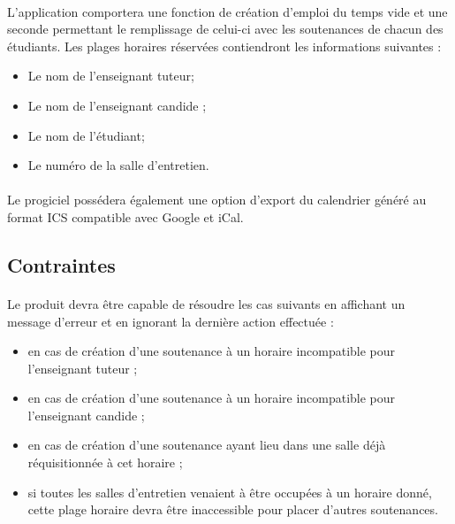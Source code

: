 \documentclass[a4paper,10pt]{report}
\begin{document}
	\paragraph{}
	L’application comportera une fonction de création d’emploi du temps vide et une seconde permettant le remplissage de celui-ci avec les soutenances de chacun des étudiants.
	\newline
	\newline
	Les plages horaires réservées contiendront les informations suivantes :
	\newline
	\renewcommand\labelitemi{\textbullet}
	\begin{itemize}
	  \item Le nom de l’enseignant tuteur;
	  \item Le nom de l’enseignant candide ;
	  \item Le nom de l’étudiant;
	  \item Le numéro de la salle d’entretien.
	\end{itemize}
	
	\paragraph{}
	Le progiciel possédera également une option d’export du calendrier généré au format ICS compatible avec Google et iCal.
	
      \subsection{Contraintes}
	\paragraph{}

	Le produit devra être capable de résoudre les cas suivants en affichant un message d’erreur et en ignorant la dernière action effectuée :
	\newline
	\renewcommand\labelitemi{\textbullet}
	\begin{itemize}
	  \item en cas de création d'une soutenance à un horaire incompatible pour l'enseignant tuteur ;
	  \item en cas de création d'une soutenance à un horaire incompatible pour l'enseignant candide ;
	  \item en cas de création d'une soutenance ayant lieu dans une salle déjà réquisitionnée à cet horaire ;
	  \item si toutes les salles d’entretien venaient à être occupées à un horaire donné, cette plage horaire devra être inaccessible pour placer d’autres soutenances.
	\end{itemize}
  
\end{document}
